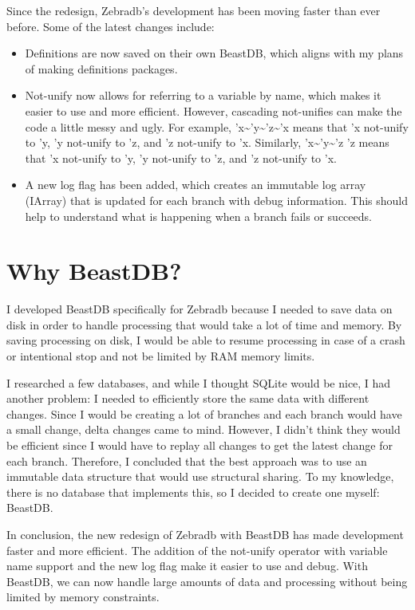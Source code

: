 \documentclass{article}
\begin{document}
Since the redesign, Zebradb's development has been moving faster than ever before. Some of the latest changes include:

\begin{itemize}
\item Definitions are now saved on their own BeastDB, which aligns with my plans of making definitions packages.
\item Not-unify now allows for referring to a variable by name, which makes it easier to use and more efficient. However, cascading not-unifies can make the code a little messy and ugly. For example, 'x\textasciitilde{}'y\textasciitilde{}'z\textasciitilde{}'x means that 'x not-unify to 'y, 'y not-unify to 'z, and 'z not-unify to 'x. Similarly, 'x\textasciitilde{}{'y\textasciitilde{}'z 'z} means that 'x not-unify to 'y, 'y not-unify to 'z, and 'z not-unify to 'x.
\item A new log flag has been added, which creates an immutable log array (IArray) that is updated for each branch with debug information. This should help to understand what is happening when a branch fails or succeeds.
\end{itemize}

\section{Why BeastDB?}

I developed BeastDB specifically for Zebradb because I needed to save data on disk in order to handle processing that would take a lot of time and memory. By saving processing on disk, I would be able to resume processing in case of a crash or intentional stop and not be limited by RAM memory limits.

I researched a few databases, and while I thought SQLite would be nice, I had another problem: I needed to efficiently store the same data with different changes. Since I would be creating a lot of branches and each branch would have a small change, delta changes came to mind. However, I didn't think they would be efficient since I would have to replay all changes to get the latest change for each branch. Therefore, I concluded that the best approach was to use an immutable data structure that would use structural sharing. To my knowledge, there is no database that implements this, so I decided to create one myself: BeastDB.

In conclusion, the new redesign of Zebradb with BeastDB has made development faster and more efficient. The addition of the not-unify operator with variable name support and the new log flag make it easier to use and debug. With BeastDB, we can now handle large amounts of data and processing without being limited by memory constraints.
\end{document}
